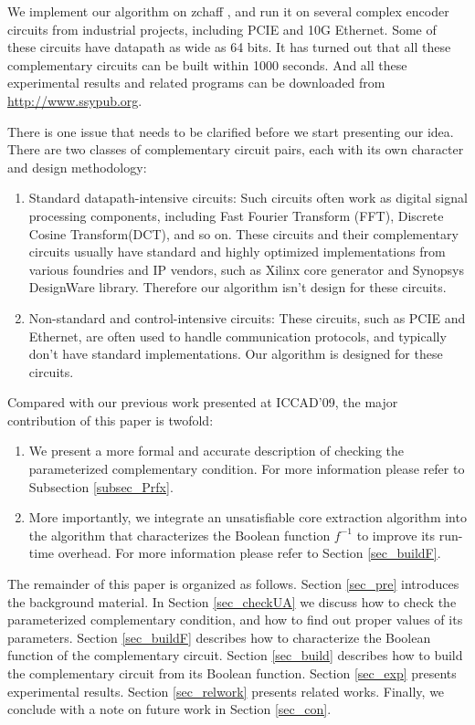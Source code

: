 \documentclass[journal]{IEEEtran}
\begin{document}
We implement our algorithm on zchaff \cite{CHAFF},
and run it on several complex encoder circuits from industrial projects,
including PCIE and 10G Ethernet.
Some of these circuits have datapath as wide as 64 bits.
It has turned out that all these complementary circuits can be built within 1000 seconds.
And all these experimental results and related programs can be downloaded from \url{http://www.ssypub.org}.


There is one issue that needs to be clarified before we start presenting our idea.
There are two classes of complementary circuit pairs,
each with its own character and design methodology:
\begin{enumerate}
  \item Standard datapath-intensive circuits:
  Such circuits often work as digital signal processing components, including
      Fast Fourier Transform (FFT),
      Discrete Cosine Transform(DCT),
      and so on.
      These circuits and their complementary circuits usually have standard and highly optimized implementations from various foundries and IP vendors,
      such as Xilinx core generator\cite{CoreGen} and Synopsys DesignWare library\cite{DesignWare}.
      Therefore our algorithm isn't design for these circuits.
  \item Non-standard and control-intensive circuits:
  These circuits,
  such as PCIE and Ethernet,
  are often used to handle communication protocols,
  and typically don't have standard implementations.
      Our algorithm is designed for these circuits.
\end{enumerate}

Compared with our previous work presented at ICCAD'09\cite{ShegnYuShen:iccad09},
the major contribution of this paper is twofold:
\begin{enumerate}
 \item We present a more formal and accurate description of checking the parameterized complementary condition. For more information please refer to Subsection \ref{subsec_Prfx}.
 \item More importantly,
we integrate an unsatisfiable core extraction algorithm into the algorithm that characterizes the Boolean function $f^{-1}$
to improve its run-time overhead.
For more information please refer to Section \ref{sec_buildF}.
\end{enumerate}

The remainder of this paper is organized as follows.
Section \ref{sec_pre} introduces the background material.
In Section \ref{sec_checkUA} we discuss how to check the parameterized complementary condition,
and how to find out proper values of its parameters.
Section \ref{sec_buildF} describes how to characterize the Boolean function of the complementary circuit.
Section \ref{sec_build} describes how to build the complementary circuit from its Boolean function.
Section \ref{sec_exp} presents experimental results.
Section \ref{sec_relwork} presents related works.
Finally,
we conclude with a note on future work in Section \ref{sec_con}.
\end{document}
